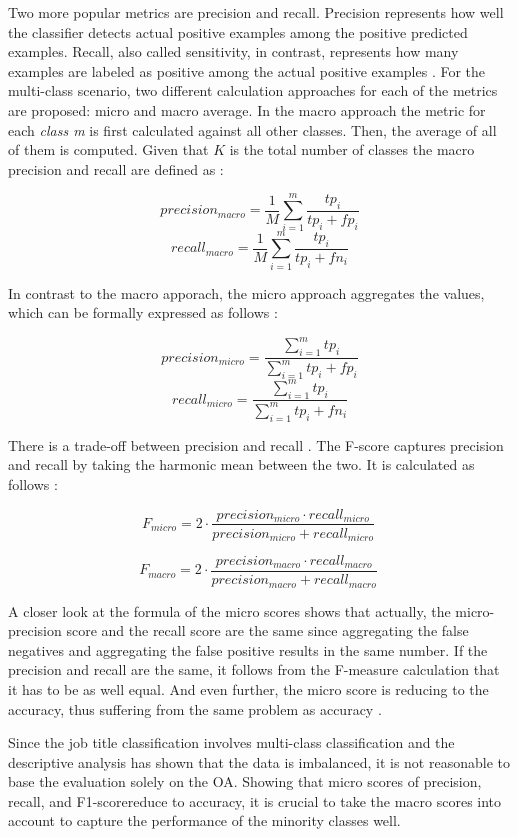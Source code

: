 \documentclass[12pt, a4paper, titlepage]{article}
\begin{document}
Two more popular metrics are precision and recall. Precision represents how well the classifier detects actual positive examples among the positive predicted examples. Recall, also called sensitivity, in contrast, represents how many examples are labeled as positive among the actual positive examples \citep{Berthold2020}. For the multi-class scenario, two different calculation approaches for each of the metrics are proposed: micro and macro average. In the macro approach the metric for each \textit{class m} is first calculated against all other classes. Then, the average of all of them is computed. Given that $K$ is the total number of classes the macro precision and recall are defined as \citep{Branco2017}:

\[precision_{macro} = \frac{1}{M} \sum_{i=1}^m \frac{tp_{i}}{tp_{i} + fp_{i}}\]
\[recall_{macro} = \frac{1}{M} \sum_{i=1}^m \frac{tp_{i}}{tp_{i} + fn_{i}}\]

In contrast to the macro apporach, the micro approach aggregates the values, which can be formally expressed as follows \citep{Branco2017}: 

\[precision_{micro} = \frac{\sum_{i=1}^m tp_i}{\sum_{i=1}^m tp_i + fp_i}\]
\[recall_{micro} = \frac{\sum_{i=1}^m tp_i}{\sum_{i=1}^m tp_i + fn_i}\]

There is a trade-off between precision and recall \citep{Buckland1994}. The F-score captures precision and recall by taking the harmonic mean between the two. It is calculated as follows \citep{Branco2017,Pan2016}:  

\[F_{micro} = 2 \cdot \frac{precision_{micro} \cdot recall_{micro} }{precision_{micro} + recall_{micro} }\ \]

\[F_{macro} = 2 \cdot \frac{precision_{macro} \cdot recall_{macro} }{precision_{macro} + recall_{macro} }\ \]

A closer look at the formula of the micro scores shows that actually, the micro-precision score and the recall score are the same since aggregating the false negatives and aggregating the false positive results in the same number. If the precision and recall are the same, it follows from the F-measure calculation that it has to be as well equal. And even further, the micro score is reducing to the accuracy, thus suffering from the same problem as accuracy \citep{grandini2020}.

Since the job title classification involves multi-class classification and the descriptive analysis has shown that the data is imbalanced, it is not reasonable to base the evaluation solely on the \ac{OA}. Showing that micro scores of precision, recall, and F1-scorereduce to accuracy, it is crucial to take the macro scores into account to capture the performance of the minority classes well.
\end{document}
